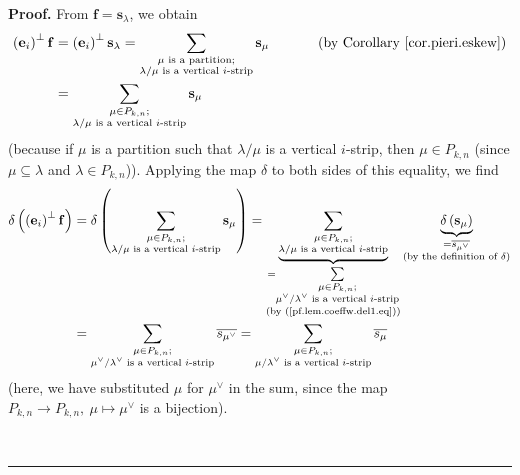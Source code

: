 \documentclass[numbers=enddot,12pt,final,onecolumn,notitlepage]{scrartcl}%
\theoremstyle{definition}
\newenvironment{proof}[1][Proof]{\noindent\textbf{#1.} }{\ \rule{0.5em}{0.5em}}
\let\sumnonlimits\sum
\renewcommand{\sum}{\sumnonlimits\limits}
\begin{document}
\begin{proof}
From $\mathbf{f}=\mathbf{s}_{\lambda}$, we obtain%
\begin{align*}
\left(  \mathbf{e}_{i}\right)  ^{\perp}\mathbf{f}  &  =\left(  \mathbf{e}%
_{i}\right)  ^{\perp}\mathbf{s}_{\lambda}=\sum_{\substack{\mu\text{ is a
partition;}\\\lambda/\mu\text{ is a vertical }i\text{-strip}}}\mathbf{s}_{\mu
}\ \ \ \ \ \ \ \ \ \ \left(  \text{by Corollary \ref{cor.pieri.eskew}}\right)
\\
&  =\sum_{\substack{\mu\in P_{k,n};\\\lambda/\mu\text{ is a vertical
}i\text{-strip}}}\mathbf{s}_{\mu}%
\end{align*}
(because if $\mu$ is a partition such that $\lambda/\mu$ is a vertical
$i$-strip, then $\mu\in P_{k,n}$ (since $\mu\subseteq\lambda$ and $\lambda\in
P_{k,n}$)). Applying the map $\delta$ to both sides of this equality, we find%
\begin{align}
\delta\left(  \left(  \mathbf{e}_{i}\right)  ^{\perp}\mathbf{f}\right)   &
=\delta\left(  \sum_{\substack{\mu\in P_{k,n};\\\lambda/\mu\text{ is a
vertical }i\text{-strip}}}\mathbf{s}_{\mu}\right)  =\underbrace{\sum
_{\substack{\mu\in P_{k,n};\\\lambda/\mu\text{ is a vertical }i\text{-strip}%
}}}_{\substack{=\sum_{\substack{\mu\in P_{k,n};\\\mu^{\vee}/\lambda^{\vee
}\text{ is a vertical }i\text{-strip}}}\\\text{(by
(\ref{pf.lem.coeffw.del1.eq}))}}}\underbrace{\delta\left(  \mathbf{s}_{\mu
}\right)  }_{\substack{=\overline{s_{\mu^{\vee}}}\\\text{(by the definition of
}\delta\text{)}}}\nonumber\\
&  =\sum_{\substack{\mu\in P_{k,n};\\\mu^{\vee}/\lambda^{\vee}\text{ is a
vertical }i\text{-strip}}}\overline{s_{\mu^{\vee}}}=\sum_{\substack{\mu\in
P_{k,n};\\\mu/\lambda^{\vee}\text{ is a vertical }i\text{-strip}}%
}\overline{s_{\mu}} \label{pf.lem.coeffw.del1.LHS}%
\end{align}
(here, we have substituted $\mu$ for $\mu^{\vee}$ in the sum, since the map
$P_{k,n}\rightarrow P_{k,n},\ \mu\mapsto\mu^{\vee}$ is a bijection).


\end{proof}
\end{document}
